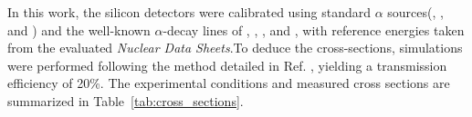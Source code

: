 \documentclass[final,5p,times,twocolumn,number,sort&compress]{elsarticle}
\begin{document}
In this work, the silicon detectors were calibrated using standard $\alpha$ sources(, , and ) and the well-known $\alpha$-decay
lines of  \cite{SINGH2019405},  \cite{ZHU20211a}, \cite{WU20071057}, and  \cite{KONDEV2018382},
with reference energies taken from the evaluated \textit{Nuclear Data Sheets}.To deduce the cross-sections, simulations were performed following the method detailed in Ref. \cite{zhang2026MonteCarloSimulation}, yielding a transmission efficiency of 20\%.
The experimental conditions and measured cross sections are summarized in Table~\ref{tab:cross_sections}.

\end{document}
